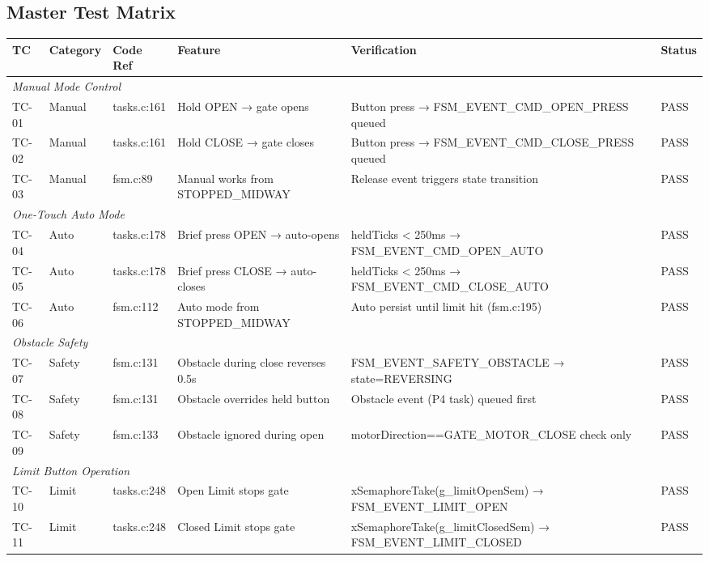 \documentclass[11pt,a4paper]{article}
\begin{document}
\subsection{Master Test Matrix}\begin{table}[H]
\centering
\tiny
\begin{tabularx}{\textwidth}{llllXl}
\toprule
\textbf{TC} & \textbf{Category} & \textbf{Code Ref} & \textbf{Feature} & \textbf{Verification} & \textbf{Status} \\
\midrule
\multicolumn{6}{l}{\textit{Manual Mode Control}} \\
TC-01 & Manual & tasks.c:161 & Hold OPEN → gate opens & Button press → FSM\_EVENT\_CMD\_OPEN\_PRESS queued & PASS \\
TC-02 & Manual & tasks.c:161 & Hold CLOSE → gate closes & Button press → FSM\_EVENT\_CMD\_CLOSE\_PRESS queued & PASS \\
TC-03 & Manual & fsm.c:89 & Manual works from STOPPED\_MIDWAY & Release event triggers state transition & PASS \\
\midrule
\multicolumn{6}{l}{\textit{One-Touch Auto Mode}} \\
TC-04 & Auto & tasks.c:178 & Brief press OPEN → auto-opens & heldTicks \textless{} 250ms → FSM\_EVENT\_CMD\_OPEN\_AUTO & PASS \\
TC-05 & Auto & tasks.c:178 & Brief press CLOSE → auto-closes & heldTicks \textless{} 250ms → FSM\_EVENT\_CMD\_CLOSE\_AUTO & PASS \\
TC-06 & Auto & fsm.c:112 & Auto mode from STOPPED\_MIDWAY & Auto persist until limit hit (fsm.c:195) & PASS \\
\midrule
\multicolumn{6}{l}{\textit{Obstacle Safety}} \\
TC-07 & Safety & fsm.c:131 & Obstacle during close reverses 0.5s & FSM\_EVENT\_SAFETY\_OBSTACLE → state=REVERSING & PASS \\
TC-08 & Safety & fsm.c:131 & Obstacle overrides held button & Obstacle event (P4 task) queued first & PASS \\
TC-09 & Safety & fsm.c:133 & Obstacle ignored during open & motorDirection==GATE\_MOTOR\_CLOSE check only & PASS \\
\midrule
\multicolumn{6}{l}{\textit{Limit Button Operation}} \\
TC-10 & Limit & tasks.c:248 & Open Limit stops gate & xSemaphoreTake(g\_limitOpenSem) → FSM\_EVENT\_LIMIT\_OPEN & PASS \\
TC-11 & Limit & tasks.c:248 & Closed Limit stops gate & xSemaphoreTake(g\_limitClosedSem) → FSM\_EVENT\_LIMIT\_CLOSED & PASS \\

\end{tabularx}
\end{table}
\end{document}
